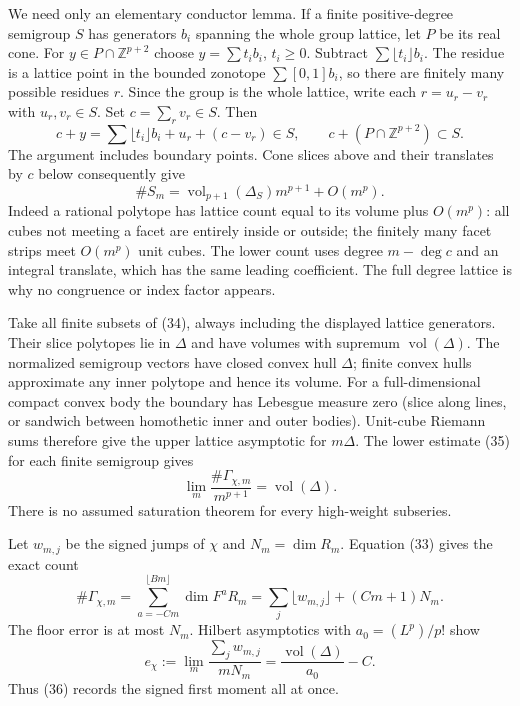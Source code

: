\documentclass[
  10pt,
]{article}
\begin{document}
We need only an elementary conductor lemma. If a finite positive-degree
semigroup \(S\) has generators \(b_i\) spanning the whole group lattice,
let \(P\) be its real cone. For \(y\in P\cap\mathbb Z^{p+2}\) choose
\(y=\sum t_ib_i\), \(t_i\geq0\). Subtract
\(\sum\lfloor t_i\rfloor b_i\). The residue is a lattice point in the
bounded zonotope \(\sum[0,1]b_i\), so there are finitely many possible
residues \(r\). Since the group is the whole lattice, write each
\(r=u_r-v_r\) with \(u_r,v_r\in S\). Set \(c=\sum_rv_r\in S\). Then
\[ c+y=\sum\lfloor t_i\rfloor b_i+u_r+(c-v_r)\in S,\qquad c+(P\cap\mathbb Z^{p+2})\subset S. \]
The argument includes boundary points. Cone slices above and their
translates by \(c\) below consequently give
\[ \#S_m=\operatorname{vol}_{p+1}(\Delta_S)m^{p+1}+O(m^p).                                    \tag{35}\]
Indeed a rational polytope has lattice count equal to its volume plus
\(O(m^p)\): all cubes not meeting a facet are entirely inside or
outside; the finitely many facet strips meet \(O(m^p)\) unit cubes. The
lower count uses degree \(m-\deg c\) and an integral translate, which
has the same leading coefficient. The full degree lattice is why no
congruence or index factor appears.

Take all finite subsets of (34), always including the displayed lattice
generators. Their slice polytopes lie in \(\Delta\) and have volumes
with supremum \(\operatorname{vol}(\Delta)\). The normalized semigroup
vectors have closed convex hull \(\Delta\); finite convex hulls
approximate any inner polytope and hence its volume. For a
full-dimensional compact convex body the boundary has Lebesgue measure
zero (slice along lines, or sandwich between homothetic inner and outer
bodies). Unit-cube Riemann sums therefore give the upper lattice
asymptotic for \(m\Delta\). The lower estimate (35) for each finite
semigroup gives
\[ \lim_m\frac{\#\Gamma_{\chi,m}}{m^{p+1}}=\operatorname{vol}(\Delta).                            \tag{36}\]
There is no assumed saturation theorem for every high-weight subseries.

Let \(w_{m,j}\) be the signed jumps of \(\chi\) and \(N_m=\dim R_m\).
Equation (33) gives the exact count
\[ \#\Gamma_{\chi,m}=\sum_{a=-Cm}^{\lfloor Bm\rfloor}\dim F^aR_m
       =\sum_j\lfloor w_{m,j}\rfloor+(Cm+1)N_m.                                                \tag{37}\]
The floor error is at most \(N_m\). Hilbert asymptotics with
\(a_0=(L^p)/p!\) show
\[ e_\chi:=\lim_m\frac{\sum_jw_{m,j}}{mN_m}=\frac{\operatorname{vol}(\Delta)}{a_0}-C.              \tag{38}\]
Thus (36) records the signed first moment all at once.
\end{document}
